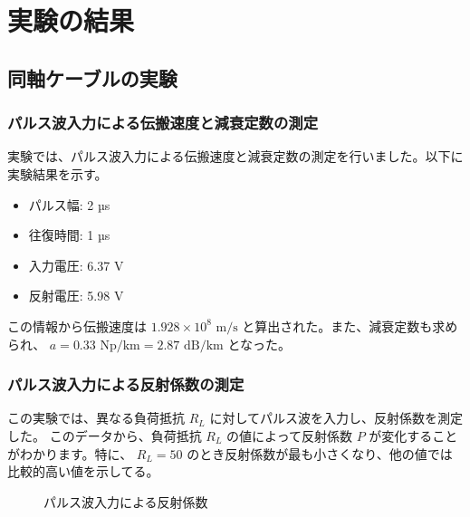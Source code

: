 \documentclass[a4paper,11pt,xelatex,ja=standard]{bxjsarticle}
\begin{document}
\section{実験の結果}
    \subsection{同軸ケーブルの実験}
        \subsubsection{パルス波入力による伝搬速度と減衰定数の測定}
            実験では、パルス波入力による伝搬速度と減衰定数の測定を行いました。以下に実験結果を示す。

            \begin{itemize}
                \item パルス幅: 2 µs
                \item 往復時間: 1 µs
                \item 入力電圧: 6.37 V
                \item 反射電圧: 5.98 V
            \end{itemize}

            この情報から伝搬速度は $1.928 \times 10^8 \text{ m/s}$ と算出された。また、減衰定数も求められ、 $a = 0.33 \text{ Np/km} = 2.87 \text{ dB/km}$ となった。
        
        \subsubsection{パルス波入力による反射係数の測定}

            この実験では、異なる負荷抵抗 \( R_L \) に対してパルス波を入力し、反射係数を測定した。
            このデータから、負荷抵抗 \( R_L \) の値によって反射係数 \( P \) が変化することがわかります。特に、 \( R_L = 50 \) のとき反射係数が最も小さくなり、他の値では比較的高い値を示してる。


            \begin{figure}[H]
                \centering
                \caption{パルス波入力による反射係数}
            \end{figure}
            
\end{document}
